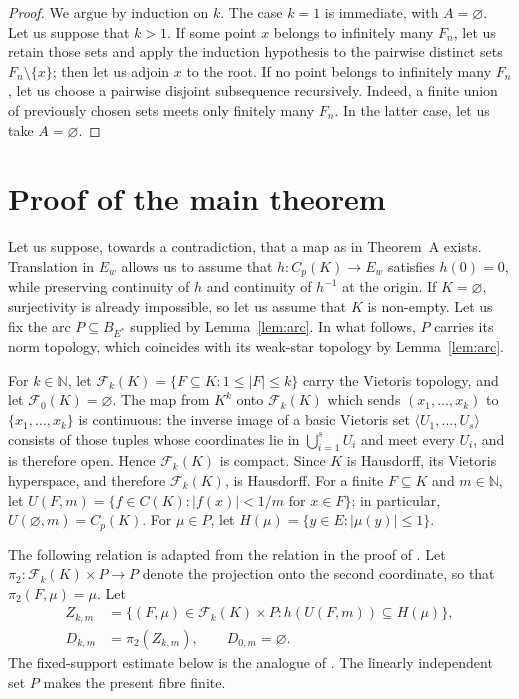 \documentclass[a4paper]{amsart}
\newcommand{\N}{\mathbb{N}}
\newcommand{\abs}[1]{\lvert #1\rvert}
\newcommand{\Fin}{\mathcal F}
\begin{document}
\begin{proof}
We argue by induction on $k$.  The case $k=1$ is immediate, with
$A=\varnothing$.  Let us suppose that $k>1$.  If some point $x$ belongs to
infinitely many $F_n$, let us retain those sets and apply the induction
hypothesis to the pairwise distinct sets $F_n\setminus\{x\}$; then
let us adjoin $x$ to the root.  If no point belongs to infinitely many $F_n$,
let us choose a pairwise disjoint subsequence recursively.  Indeed, a finite
union of previously chosen sets meets only finitely many $F_n$.  In the
latter case, let us take $A=\varnothing$.
\end{proof}

\section{Proof of the main theorem}
\label{sec:main-proof}

Let us suppose, towards a contradiction, that a map as in Theorem~A exists.
Translation in $E_w$ allows us to assume that
$h\colon C_p(K)\to E_w$ satisfies $h(0)=0$,
while preserving continuity of $h$ and continuity of $h^{-1}$ at the
origin.  If $K=\varnothing$, surjectivity is already impossible, so let
us assume that $K$ is non-empty.  Let us fix the arc
$P\subseteq B_{E^*}$ supplied
by Lemma~\ref{lem:arc}.
In what follows, $P$ carries its norm topology, which coincides with
its weak-star topology by Lemma~\ref{lem:arc}.

For $k\in\N$, let
$\Fin_k(K)=\{F\subseteq K:1\leqslant\abs F\leqslant k\}$ carry the
Vietoris topology, and let $\Fin_0(K)=\varnothing$.  The map from $K^k$
onto $\Fin_k(K)$ which sends $(x_1,\ldots,x_k)$ to
$\{x_1,\ldots,x_k\}$ is continuous: the inverse image of a basic
Vietoris set $\langle U_1,\ldots,U_s\rangle$ consists of those tuples
whose coordinates lie in $\bigcup_{i=1}^s U_i$ and meet every $U_i$,
and is therefore open.  Hence $\Fin_k(K)$ is compact.  Since $K$ is
Hausdorff, its Vietoris hyperspace, and therefore $\Fin_k(K)$, is
Hausdorff.  For a
finite $F\subseteq K$ and $m\in\N$, let
$U(F,m)=\{f\in C(K):\abs{f(x)}<1/m\text{ for }x\in F\}$; in particular,
$U(\varnothing,m)=C_p(K)$.  For $\mu\in P$, let
$H(\mu)=\{y\in E:\abs{\mu(y)}\leqslant1\}$.

The following relation is adapted from the relation in the proof of
\cite[Theorem~4.1]{KrupskiMarciszewski2017}.  Let
$\pi_2\colon\Fin_k(K)\times P\to P$ denote the projection onto the
second coordinate, so that $\pi_2(F,\mu)=\mu$.  Let
\[
 \begin{split}
 Z_{k,m}&=\{(F,\mu)\in\Fin_k(K)\times P:
                    h(U(F,m))\subseteq H(\mu)\},\\
 D_{k,m}&=\pi_2(Z_{k,m}),\qquad D_{0,m}=\varnothing.
 \end{split}
\]
The fixed-support estimate below is the analogue of
\cite[Claim~1, p.~651]{KrupskiMarciszewski2017}.  The linearly independent
set $P$ makes the present fibre finite.
\end{document}
